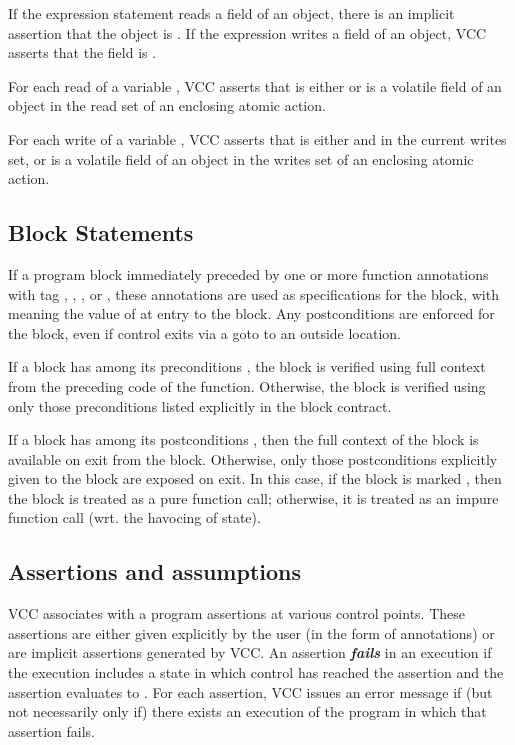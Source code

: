 \documentclass[preprint,nocopyrightspace]{sigplanconf}
\newcommand{\Def}[1]{\textit{\textbf{#1}}}
\begin{document}
{{{{\begin{VCC}
If the expression statement reads a field of an object, there is an
implicit assertion that the object is .
If the expression writes a field of an object, VCC asserts that the
field is \vcc{\writable}.  

For each read of a variable , VCC asserts that 
is either  or is a volatile field of an object in
the read set of an enclosing atomic action. 

For each write of a variable , VCC asserts that  is
either  and in the current writes set, or is a volatile
field of an object in the writes set of an enclosing atomic action.

\subsection{Block Statements}
If a program block immediately preceded by one or more function
annotations with tag , , ,
or , these annotations are used as specifications for the
block, with  meaning the value of  at entry to the
block. Any postconditions are enforced for the block, even if control
exits via a goto to an outside location.

If a block has among its
preconditions , the block is verified
using full context from the preceding code of the function. Otherwise,
the block is verified using only those preconditions listed explicitly
in the block contract.

If a block has among its
postconditions , then the full context
of the block is available on exit from the block. Otherwise, only
those postconditions explicitly given to the block are exposed on
exit. In this case, if the block is marked , then the
block is treated as a pure function call; otherwise, it is treated as
an impure function call (wrt. the havocing of state). 

\subsection{Assertions and assumptions}
VCC associates with a program assertions at various control
points. These assertions are either given explicitly by the user (in
the form of  annotations) or are implicit assertions
generated by VCC. An assertion \Def{fails} in an execution if the
execution includes a state in which control has reached the assertion
and the assertion evaluates to . For each assertion, VCC issues an
error message if (but not necessarily only if) there exists an
execution of the program in which that assertion fails.


\end{VCC}}}}}
\end{document}
